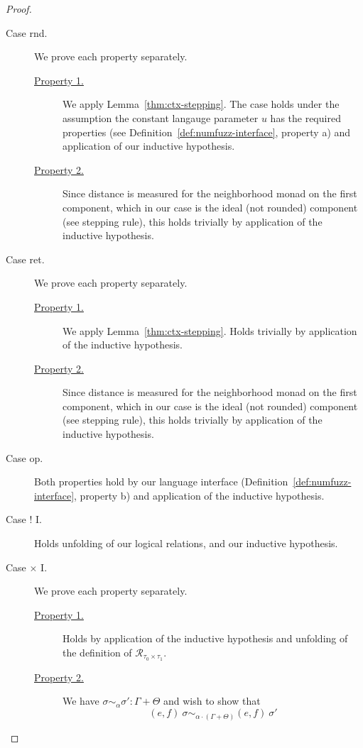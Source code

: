 \begin{proof}
\begin{description}
    \item[Case rnd.] 
      We prove each property separately.
      \begin{description}
        \item[\underline{Property 1.}]
          We apply Lemma~\ref{thm:ctx-stepping}. The case holds under the
          assumption the constant langauge parameter $u$ has the required
          properties (see Definition~\ref{def:numfuzz-interface}, property a)
          and application of our inductive hypothesis.
        \item[\underline{Property 2.}]
          Since distance is measured for the neighborhood monad on the first
          component, which in our case is the ideal (not rounded) component (see
          stepping rule), this holds trivially by application of the inductive
          hypothesis.
      \end{description}

    \item[Case ret.] 
      We prove each property separately.
      \begin{description}
        \item[\underline{Property 1.}]
          We apply Lemma~\ref{thm:ctx-stepping}. Holds trivially by application
          of the inductive hypothesis.
        \item[\underline{Property 2.}]
          Since distance is measured for the neighborhood monad on the first
          component, which in our case is the ideal (not rounded) component (see
          stepping rule), this holds trivially by application of the inductive
          hypothesis.
      \end{description}

    \item[Case op.] 
      Both properties hold by our language interface
      (Definition~\ref{def:numfuzz-interface}, property b) and application of
      the inductive hypothesis.

    \item[Case ! I.] Holds unfolding of our logical relations, and our inductive
      hypothesis.

    \item[Case $\times$ I.] 
      We prove each property separately.
      \begin{description}
        \item[\underline{Property 1.}]
          Holds by application of the inductive hypothesis and unfolding of the
          definition of $\mathcal{R}_{\tau_0 \times \tau_1}$.
        \item[\underline{Property 2.}]
          We have 
          $\sigma \sim_{\alpha} \sigma' : \Gamma + \Theta$ 
          and wish to show that
          $$(e, f)~\sigma \sim_{\alpha \cdot (\Gamma + \Theta)} (e, f)~\sigma'$$


\end{description}
\end{description}
\end{proof}
